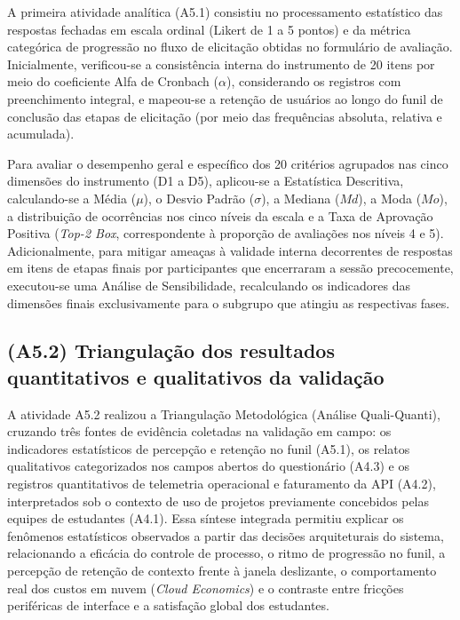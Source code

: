 A primeira atividade analítica (A5.1) consistiu no processamento estatístico das respostas fechadas em escala ordinal (Likert de 1 a 5 pontos) e da métrica categórica de progressão no fluxo de elicitação obtidas no formulário de avaliação. Inicialmente, verificou-se a consistência interna do instrumento de 20 itens por meio do coeficiente Alfa de Cronbach ($\alpha$), considerando os registros com preenchimento integral, e mapeou-se a retenção de usuários ao longo do funil de conclusão das etapas de elicitação (por meio das frequências absoluta, relativa e acumulada).

Para avaliar o desempenho geral e específico dos 20 critérios agrupados nas cinco dimensões do instrumento (D1 a D5), aplicou-se a Estatística Descritiva, calculando-se a Média ($\mu$), o Desvio Padrão ($\sigma$), a Mediana ($Md$), a Moda ($Mo$), a distribuição de ocorrências nos cinco níveis da escala e a Taxa de Aprovação Positiva (\textit{Top-2 Box}, correspondente à proporção de avaliações nos níveis 4 e 5). Adicionalmente, para mitigar ameaças à validade interna decorrentes de respostas em itens de etapas finais por participantes que encerraram a sessão precocemente, executou-se uma Análise de Sensibilidade, recalculando os indicadores das dimensões finais exclusivamente para o subgrupo que atingiu as respectivas fases.

\subsection{(A5.2) Triangulação dos resultados quantitativos e qualitativos da validação}

A atividade A5.2 realizou a Triangulação Metodológica (Análise Quali-Quanti), cruzando três fontes de evidência coletadas na validação em campo: os indicadores estatísticos de percepção e retenção no funil (A5.1), os relatos qualitativos categorizados nos campos abertos do questionário (A4.3) e os registros quantitativos de telemetria operacional e faturamento da API (A4.2), interpretados sob o contexto de uso de projetos previamente concebidos pelas equipes de estudantes (A4.1). Essa síntese integrada permitiu explicar os fenômenos estatísticos observados a partir das decisões arquiteturais do sistema, relacionando a eficácia do controle de processo, o ritmo de progressão no funil, a percepção de retenção de contexto frente à janela deslizante, o comportamento real dos custos em nuvem (\textit{Cloud Economics}) e o contraste entre fricções periféricas de interface e a satisfação global dos estudantes.

